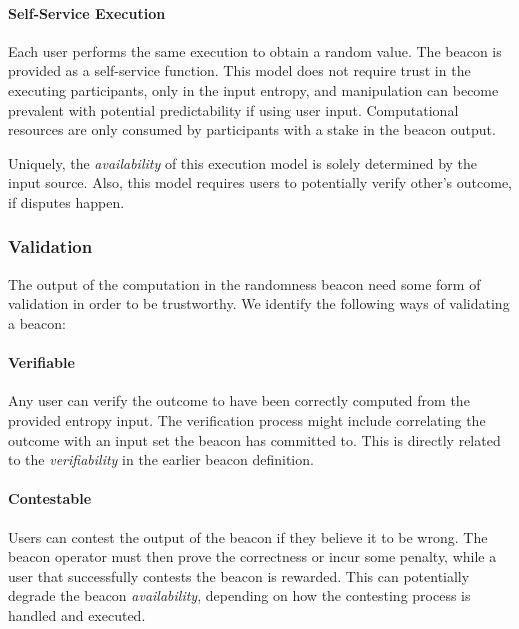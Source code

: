 \paragraph{Self-Service Execution}
Each user performs the same execution to obtain a random value.
The beacon is provided as a self-service function.
This model does not require trust in the executing participants, only in the input entropy, and manipulation can become prevalent with potential predictability if using user input.
Computational resources are only consumed by participants with a stake in the beacon output.

Uniquely, the \emph{availability} of this execution model is solely determined by the input source.
Also, this model requires users to potentially verify other's outcome, if disputes happen.

\subsubsection{Validation}
The output of the computation in the randomness beacon need some form of validation in order to be trustworthy.
We identify the following ways of validating a beacon:

\paragraph{Verifiable}
Any user can verify the outcome to have been correctly computed from the provided entropy input.
The verification process might include correlating the outcome with an input set the beacon has committed to.
This is directly related to the \emph{verifiability} in the earlier beacon definition.

\paragraph{Contestable}
Users can contest the output of the beacon if they believe it to be wrong.
The beacon operator must then prove the correctness or incur some penalty, while a user that successfully contests the beacon is rewarded.
This can potentially degrade the beacon \emph{availability}, depending on how the contesting process is handled and executed.

